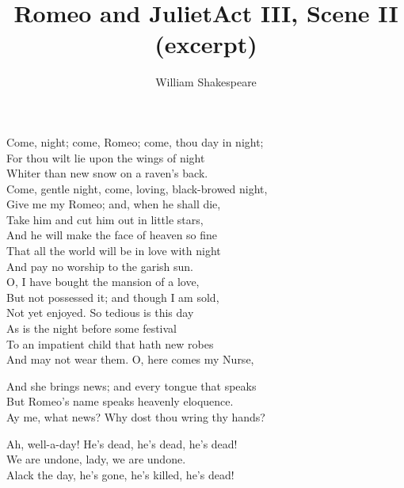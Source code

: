 \documentclass[10pt,a4paper]{article}
\newcommand{\subtitle}[1]{\vspace{10pt}\newline\normalsize\plantin #1}
\begin{document}
\title{Romeo and Juliet\subtitle{Act III, Scene II (excerpt)}}
\date{\vspace{-3em}} %
\author{William Shakespeare}
\maketitle
    
\thispagestyle{plain}
\setcounter{page}{1}




\begin{drama*}

\julspeaks
Come, night; come, Romeo; come, thou day in night;\\
For thou wilt lie upon the wings of night\\
Whiter than new snow on a raven's back.\\
Come, gentle night, come, loving, black-browed night,\\
Give me my Romeo; and, when he shall die,\\
Take him and cut him out in little stars,\\
And he will make the face of heaven so fine\\
That all the world will be in love with night\\
And pay no worship to the garish sun.\\
O, I have bought the mansion of a love,\\
But not possessed it; and though I am sold,\\
Not yet enjoyed. So tedious is this day\\
As is the night before some festival\\
To an impatient child that hath new robes\\
And may not wear them. O, here comes my Nurse,


\julspeaks
And she brings news; and every tongue that speaks\\
But Romeo's name speaks heavenly eloquence.\\
Ay me, what news? Why dost thou wring thy hands?

\nursespeaks
Ah, well-a-day! He's dead, he's dead, he's dead!\\
We are undone, lady, we are undone.\\
Alack the day, he's gone, he's killed, he's dead!


\end{drama*}
\end{document}
